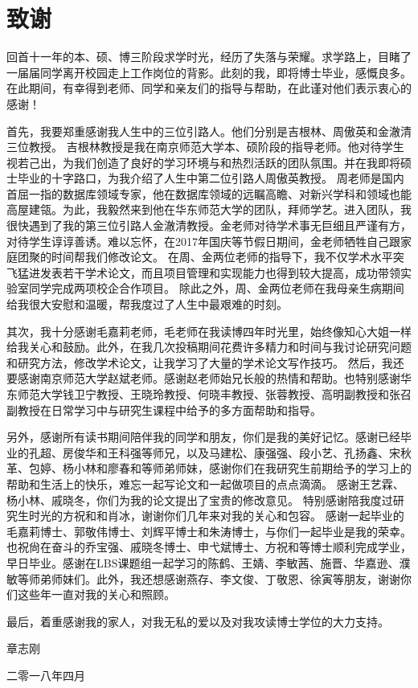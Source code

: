 {\kaishu
\chapter*{致\qquad 谢}
\begin{spacing}{1.5}
	
	
回首十一年的本、硕、博三阶段求学时光，经历了失落与荣耀。求学路上，目睹了一届届同学离开校园走上工作岗位的背影。此刻的我，即将博士毕业，感慨良多。在此期间，有幸得到老师、同学和亲友们的指导与帮助，在此谨对他们表示衷心的感谢！
	
首先，我要郑重感谢我人生中的三位引路人。他们分别是吉根林、周傲英和金澈清三位教授。
吉根林教授是我在南京师范大学本、硕阶段的指导老师。他对待学生视若己出，为我们创造了良好的学习环境与和热烈活跃的团队氛围。并在我即将硕士毕业的十字路口，为我介绍了人生中第二位引路人周傲英教授。
周老师是国内首屈一指的数据库领域专家，他在数据库领域的远瞩高瞻、对新兴学科和领域也能高屋建瓴。为此，我毅然来到他在华东师范大学的团队，拜师学艺。进入团队，我很快遇到了我的第三位引路人金澈清教授。金老师对待学术事无巨细且严谨有方，对待学生谆谆善诱。难以忘怀，在2017年国庆等节假日期间，金老师牺牲自己跟家庭团聚的时间帮我们修改论文。
在周、金两位老师的指导下，我不仅学术水平突飞猛进发表若干学术论文，而且项目管理和实现能力也得到较大提高，成功带领实验室同学完成两项校企合作项目。
除此之外，周、金两位老师在我母亲生病期间给我很大安慰和温暖，帮我度过了人生中最艰难的时刻。


其次，我十分感谢毛嘉莉老师，毛老师在我读博四年时光里，始终像知心大姐一样给我关心和鼓励。此外，在我几次投稿期间花费许多精力和时间与我讨论研究问题和研究方法，修改学术论文，让我学习了大量的学术论文写作技巧。
然后，我还要感谢南京师范大学赵斌老师。感谢赵老师始兄长般的热情和帮助。也特别感谢华东师范大学钱卫宁教授、王晓玲教授、何晓丰教授、张蓉教授、高明副教授和张召副教授在日常学习中与研究生课程中给予的多方面帮助和指导。


另外，感谢所有读书期间陪伴我的同学和朋友，你们是我的美好记忆。感谢已经毕业的孔超、房俊华和王科强等师兄，以及马建松、康强强、段小艺、孔扬鑫、宋秋革、包婷、杨小林和廖春和等师弟师妹，感谢你们在我研究生前期给予的学习上的帮助和生活上的快乐，难忘一起写论文和一起做项目的点点滴滴。
感谢王艺霖、杨小林、戚晓冬，你们为我的论文提出了宝贵的修改意见。
特别感谢陪我度过研究生时光的方祝和和肖冰，谢谢你们几年来对我的关心和包容。
感谢一起毕业的毛嘉莉博士、郭敬伟博士、刘辉平博士和朱涛博士，与你们一起毕业是我的荣幸。也祝尙在奋斗的乔宝强、戚晓冬博士、申弋斌博士、方祝和等博士顺利完成学业，早日毕业。感谢在LBS课题组一起学习的陈鹤、王婧、李敏茜、施晋、华嘉逊、濮敏等师弟师妹们。此外，我还想感谢燕存、李文俊、丁敬恩、徐寅等朋友，谢谢你们这些年一直对我的关心和照顾。

最后，着重感谢我的家人，对我无私的爱以及对我攻读博士学位的大力支持。

\end{spacing}
\vspace{0cm} \hspace{10.8cm}  章志刚

\hspace{9.8cm}  二零一八年四月 }
